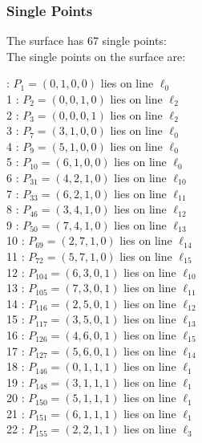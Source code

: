 \documentclass{article}
\begin{document}
{\subsubsection*{Single Points}
The surface has 67 single points:\\
The single points on the surface are:\\
\begin{multicols}{2}
 : $P_{1}=( 0, 1, 0, 0 )$ lies on line $\ell_{0}$\\
1 : $P_{2}=( 0, 0, 1, 0 )$ lies on line $\ell_{2}$\\
2 : $P_{3}=( 0, 0, 0, 1 )$ lies on line $\ell_{2}$\\
3 : $P_{7}=( 3, 1, 0, 0 )$ lies on line $\ell_{0}$\\
4 : $P_{9}=( 5, 1, 0, 0 )$ lies on line $\ell_{0}$\\
5 : $P_{10}=( 6, 1, 0, 0 )$ lies on line $\ell_{0}$\\
6 : $P_{31}=( 4, 2, 1, 0 )$ lies on line $\ell_{10}$\\
7 : $P_{33}=( 6, 2, 1, 0 )$ lies on line $\ell_{11}$\\
8 : $P_{46}=( 3, 4, 1, 0 )$ lies on line $\ell_{12}$\\
9 : $P_{50}=( 7, 4, 1, 0 )$ lies on line $\ell_{13}$\\
10 : $P_{69}=( 2, 7, 1, 0 )$ lies on line $\ell_{14}$\\
11 : $P_{72}=( 5, 7, 1, 0 )$ lies on line $\ell_{15}$\\
12 : $P_{104}=( 6, 3, 0, 1 )$ lies on line $\ell_{10}$\\
13 : $P_{105}=( 7, 3, 0, 1 )$ lies on line $\ell_{11}$\\
14 : $P_{116}=( 2, 5, 0, 1 )$ lies on line $\ell_{12}$\\
15 : $P_{117}=( 3, 5, 0, 1 )$ lies on line $\ell_{13}$\\
16 : $P_{126}=( 4, 6, 0, 1 )$ lies on line $\ell_{15}$\\
17 : $P_{127}=( 5, 6, 0, 1 )$ lies on line $\ell_{14}$\\
18 : $P_{146}=( 0, 1, 1, 1 )$ lies on line $\ell_{1}$\\
19 : $P_{148}=( 3, 1, 1, 1 )$ lies on line $\ell_{1}$\\
20 : $P_{150}=( 5, 1, 1, 1 )$ lies on line $\ell_{1}$\\
21 : $P_{151}=( 6, 1, 1, 1 )$ lies on line $\ell_{1}$\\
22 : $P_{155}=( 2, 2, 1, 1 )$ lies on line $\ell_{3}$\\

\end{multicols}}
\end{document}

